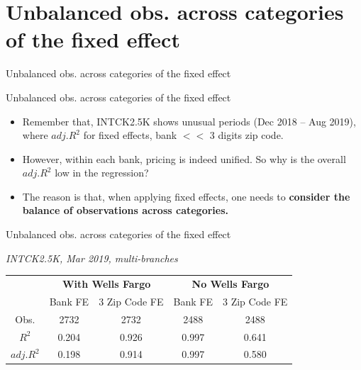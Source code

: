 \documentclass{beamer}
\begin{document}
\section{Unbalanced obs. across categories of the fixed effect}

\begin{frame}
    \vfill
    \centering
    {Unbalanced obs. across categories of the fixed effect}
    \vfill
\end{frame}


\begin{frame}{Unbalanced obs. across categories of the fixed effect}
    \begin{itemize}
        \item Remember that, INTCK2.5K shows unusual periods (Dec 2018 – Aug 2019), \\
where $adj.R^2$ for fixed effects, bank $<$$<$ 3 digits zip code.
\item However, within each bank, pricing is indeed unified. So why is the overall $adj.R^2$ low in the regression?
\item The reason is that, when applying fixed effects, one needs to \textbf{consider the balance of observations across categories.}
    \end{itemize}
\end{frame}

\begin{frame}{Unbalanced obs. across categories of the fixed effect}

\textit{INTCK2.5K, Mar 2019, multi-branches}

\vspace{1em}

\small
\begin{table}[]
	\centering
	\begin{tabular}{ccccc}
		\hline
		            & \multicolumn{2}{c}{\textbf{With Wells Fargo}}    & \multicolumn{2}{c}{\textbf{No Wells Fargo}}    \\
		            & Bank FE            & 3 Zip Code FE      & Bank FE           & 3 Zip Code FE     \\ \hline
		Obs.        & 2732               & 2732               & 2488              & 2488              \\
		$R^{2}$     & 0.204              & 0.926              & 0.997             & 0.641             \\
		$adj.R^{2}$ & 0.198              & 0.914              & 0.997             & 0.580             \\ \hline
	\end{tabular}
\end{table}


\end{frame}
\end{document}
